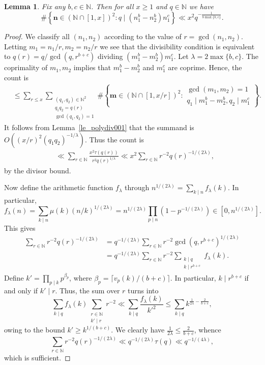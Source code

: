 \documentclass[11pt,letterpaper]{amsart}
\renewcommand{\leq}{\leqslant}
\renewcommand{\geq}{\geqslant}
\newtheorem{lemma}[theorem]{Lemma}
\theoremstyle{definition}
\numberwithin{equation}{section}
\newcommand\N{\mathbb{N}}
\newcommand{\0}{\mathbf{0}}
\begin{document}
\begin{lemma}\label{l:polydplnit} 
 Fix any  $ b,c\in \N$. Then for all $x\geq 1 $  and $q\in \N$ 
we have 
\[
\# \left\{ \mathbf n\in (\N\cap[1,x])^2: q\mid (n_1^b-n_2^b)n_1^c   \right\}\ll 
x^2 q^{-\frac{1}{8\max\{b,c\}}}.
\]
\end{lemma}
\begin{proof} We classify all $(n_1,n_2)$ according to the value of $r=\gcd(n_1,n_2)$. Letting $m_1=n_1/r, m_2=n_2/r$ 
we see that the divisibility condition is equivalent to $q(r)= q/\gcd(q,r^{b+c})$ dividing $(m_1^b-m_2^b)m_1^c $. 
Let $\lambda=2\max\{b,c\}$.
The coprimality of $m_1,m_2$
implies that $m_1^b-m_2^b$ and $m_1^c $ are coprime.  Hence, the count is 
\begin{align*}
&\leq \sum_{r\leq x  }\sum_{\substack{ (q_1,q_2) \in \N^2 \\ q_1 q_2 =q(r) \\ \gcd(q_1,q_2)=1  }} 
\# \left\{  \mathbf m \in (\N\cap[1,x/r])^2
:
\begin{array}{l}
\gcd(m_1,m_2)=1\\   q_1 \mid   m_1^b-  m_2^b, q_2 \mid m_1^c
\end{array}
\right\}.
\end{align*}
It follows from  Lemma~\ref{le_polydiv001}  that the summand is 
$O((x/r)^2 (q_1q_2)^{-1/\lambda })$.
Thus the count is 
\begin{align*}
&\ll 
\sum_{r\in \N } \frac{x^2\tau(q(r))}{r^2q(r)^{1/\lambda}}
\ll  x^2 \sum_{r\in \N } r^{-2}q(r)^{-1/(2\lambda)},
\end{align*}
by the divisor bound.

Now define the arithmetic function $f_\lambda$ through $n^{1/(2\lambda)}= \sum_{k\mid n } f_\lambda (k ).$
In particular,  $$ f_\lambda(n) = \sum_{k\mid n } \mu(k) (n/k)^{1/(2\lambda)}=n^{1/(2\lambda)} \prod_{p\mid n } (1-p^{-1/(2\lambda)})
\in \left[0,   n^{1/(2\lambda)} \right].$$ This gives 
\begin{align*} \sum_{r\in \N } r^{-2}q(r)^{-1/(2\lambda)}
&= q^{-1/(2\lambda)}\sum_{r\in \N } r^{-2}\gcd(q,r^{b+c})^{1/(2\lambda)}\\ &=
q^{-1/(2\lambda)}
\sum_{r\in \N } r^{-2}\sum_{\substack{k\mid q\\ k\mid  r^{b+c}} } f_\lambda (k ).
\end{align*}
 Define $k'=\prod_{p\mid k}p^{\beta_p}$, where 
$\beta_p=\lceil v_p(k)/(b+c)\rceil$. In particular, $k\mid  r^{b+c}$ if and only if 
$k'\mid r$. Thus, the sum over $r$ turns    into  $$  
 \sum_{k\mid q } f_\lambda (k )\sum_{\substack{r\in \N\\ k'\mid  r}    } r^{-2}
\ll 
 \sum_{k\mid q } \frac{f_\lambda (k )}{k'^2}\leq  \sum_{k\mid q }  k^{\frac{1}{2\lambda}   -\frac{2}{ b+c }  }
  ,$$ owing to the bound $k' \geq k^{1/(b+c)}$. We clearly have $\frac{1}{2\lambda}   \leq \frac{2}{ b+c } $, whence
$$ \sum_{r\in \N} r^{-2} q(r)^{-1/(2\lambda) } \ll q^{-1/(2\lambda)} \tau(q) \ll q^{-1/(4\lambda)} ,$$
which is sufficient.
\end{proof}
 
\end{document}
